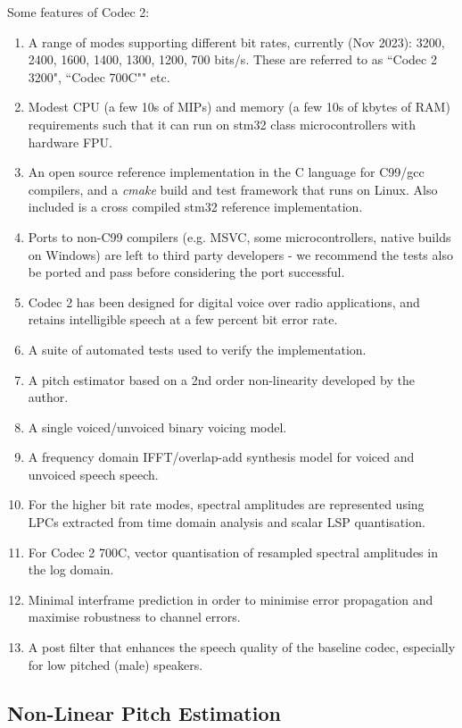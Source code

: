 \documentclass{article}
\begin{document}
Some features of Codec 2:
\begin{enumerate}
\item A range of modes supporting different bit rates, currently (Nov 2023): 3200, 2400, 1600, 1400, 1300, 1200, 700 bits/s.  These are referred to as ``Codec 2 3200", ``Codec 700C"" etc.
\item Modest CPU (a few 10s of MIPs) and memory (a few 10s of kbytes of RAM) requirements such that it can run on stm32 class microcontrollers with hardware FPU.
\item An open source reference implementation in the C language for C99/gcc compilers, and a \emph{cmake} build and test framework that runs on Linux.  Also included is a cross compiled stm32 reference implementation.
\item Ports to non-C99 compilers (e.g. MSVC, some microcontrollers, native builds on Windows) are left to third party developers - we recommend the tests also be ported and pass before considering the port successful.
\item Codec 2 has been designed for digital voice over radio applications, and retains intelligible speech at a few percent bit error rate.
\item A suite of automated tests used to verify the implementation.
\item A pitch estimator based on a 2nd order non-linearity developed by the author.
\item A single voiced/unvoiced binary voicing model.
\item A frequency domain IFFT/overlap-add synthesis model for voiced and unvoiced speech speech.
\item For the higher bit rate modes, spectral amplitudes are represented using LPCs extracted from time domain analysis and scalar LSP quantisation.
\item For Codec 2 700C, vector quantisation of resampled spectral amplitudes in the log domain.
\item Minimal interframe prediction in order to minimise error propagation and maximise robustness to channel errors.
\item A post filter that enhances the speech quality of the baseline codec, especially for low pitched (male) speakers.
\end{enumerate}

\subsection{Non-Linear Pitch Estimation}
\end{document}

